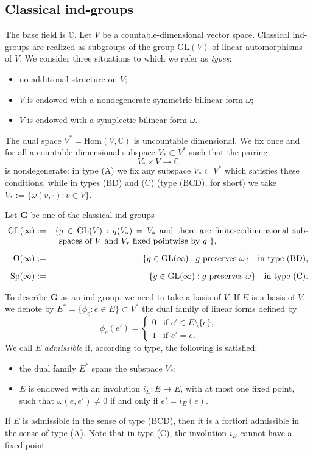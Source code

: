 \documentclass[12pt]{amsart}
\newcommand{\GL}{\mathrm{GL}}
\newcommand{\Sp}{\mathrm{Sp}}
\renewcommand{\O}{\mathrm{O}}
\newcommand{\G}{\mathbf{G}}
\newcommand{\Hom}{\mathrm{Hom}}
\newcommand{\C}{\mathbb{C}}
\numberwithin{equation}{section}
\theoremstyle{definition}
\begin{document}
\subsection{Classical ind-groups}
\label{section-1.1}
The base field is $\C$. Let $V$ be a countable-dimensional vector space. Classical ind-groups are realized as subgroups of the group $\GL(V)$ of linear automorphisms of $V$. We consider three situations to which we refer as {\em types}:
\begin{itemize}
\item[(A)] no additional structure on $V$;
\item[(BD)] $V$ is endowed with a nondegenerate symmetric bilinear form $\omega$;
\item[(C)] $V$ is endowed with a symplectic bilinear form $\omega$.
\end{itemize}
The dual space $V^*=\Hom(V,\C)$ is uncountable dimensional. We fix once and for all a countable-dimensional subspace $V_*\subset V^*$ such that the pairing $$V_*\times V\to\C$$ is nondegenerate:
in type (A) we fix any subspace $V_*\subset V^*$ which satisfies these conditions, while
in types (BD) and (C) (type (BCD), for short) we take $V_*:=\{\omega(v,\cdot):v\in V\}$.

Let $\G$ be one of the classical ind-groups
\begin{eqnarray*}
\GL(\infty) & := & \{\parbox[t]{10.3cm}{$g\in\GL(V):$ $g(V_*)=V_*$ and there are finite-codimensional subspaces of $V$ and $V_*$  fixed pointwise by $g$ $\}$,} \\[2mm]
\O(\infty) & := & \{g\in\GL(\infty):\mbox{$g$ preserves $\omega$}\}\quad \mbox{in type (BD),} \\[2mm]
\Sp(\infty) & := & \{g\in\GL(\infty):\mbox{$g$ preserves $\omega$}\}\quad \mbox{in type (C).}
\end{eqnarray*}

To describe $\G$ as an ind-group, we need to take a basis of $V$.
If $E$ is a basis of $V$, we denote by $E^*=\{\phi_e:e\in E\}\subset V^*$ the dual family of linear forms defined by
\[\phi_e(e')=\left\{\begin{array}{ll} 0 & \mbox{if $e'\in E\setminus\{e\}$,} \\ 1 & \mbox{if $e'=e$.} \end{array}\right. \]
We call $E$ {\em admissible} if, according to type, the following is satisfied:
\begin{itemize}
\item[(A)] the dual family $E^*$ spans the subspace $V_*$;
\item[(BCD)] $E$ is endowed with an involution $i_E:E\to E$, with at most one fixed point, such that $\omega(e,e')\not=0$ if and only if $e'=i_E(e)$.
\end{itemize}
If $E$ is admissible in the sense of type (BCD), then it is a fortiori admissible in the sense of type (A). Note that in type (C), the involution $i_E$ cannot have a fixed point.
\end{document}
